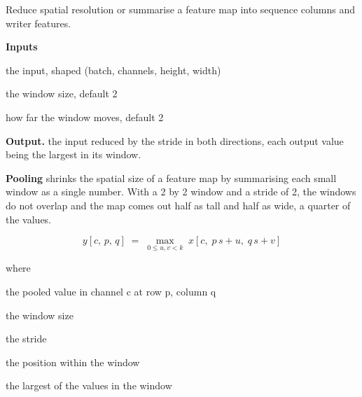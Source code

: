 Reduce spatial resolution or summarise a feature map into sequence columns and writer features.




\noindent\textbf{Inputs}
\begin{description}[leftmargin=2.2em,style=nextline,font=\normalfont\ttfamily]\setlength\itemsep{1pt}
  \item[{x}] \normalfont the input, shaped (batch, channels, height, width)
  \item[{kernel}] \normalfont the window size, default 2
  \item[{stride}] \normalfont how far the window moves, default 2
\end{description}

\noindent\textbf{Output.} the input reduced by the stride in both directions, each output value being the largest in its window.


\textbf{Pooling} shrinks the spatial size of a feature map by summarising each small window as a single number. With a 2 by 2 window and a stride of 2, the windows do not overlap and the map comes out half as tall and half as wide, a quarter of the values.


\begin{equation}
y[c,\,p,\,q] \;=\; \max_{0 \le u,v < k} \; x[c,\; p\,s+u,\; q\,s+v]
\end{equation}

\noindent where
\begin{description}[leftmargin=2.4em,style=nextline,font=\normalfont\ttfamily]\setlength\itemsep{1pt}
  \item[{$y[c,p,q]$}] \normalfont the pooled value in channel c at row p, column q
  \item[{$k$}] \normalfont the window size
  \item[{$s$}] \normalfont the stride
  \item[{$u,\,v$}] \normalfont the position within the window
  \item[{$\max$}] \normalfont the largest of the values in the window
\end{description}


